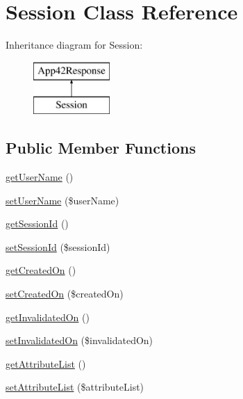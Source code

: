 \hypertarget{class_session}{\section{Session Class Reference}
\label{class_session}
}
Inheritance diagram for Session\+:\begin{figure}[H]
\begin{center}
\leavevmode
\includegraphics[height=2.000000cm]{class_session}
\end{center}
\end{figure}
\subsection*{Public Member Functions}
\begin{DoxyCompactItemize}
\item 
\hyperlink{class_session_aafd6d1ef27e6acc5833aba4012e5ee77}{get\+User\+Name} ()
\item 
\hyperlink{class_session_a20f0087f72763b84d2992ba6ffee2fb2}{set\+User\+Name} (\$user\+Name)
\item 
\hyperlink{class_session_aa9889007e27fedadb28ae8f2fd77a569}{get\+Session\+Id} ()
\item 
\hyperlink{class_session_ace8bf79f08c5588b7b15f2fc69386560}{set\+Session\+Id} (\$session\+Id)
\item 
\hyperlink{class_session_a346b90b05b25684ab3d2c62566270551}{get\+Created\+On} ()
\item 
\hyperlink{class_session_adff89ef96f7c1e0f0752caca8ccc750b}{set\+Created\+On} (\$created\+On)
\item 
\hyperlink{class_session_a2a1eeaf1dae4ab3d7dcb7551877860cd}{get\+Invalidated\+On} ()
\item 
\hyperlink{class_session_a2febff796a1f30db3685bb7acdc7abf5}{set\+Invalidated\+On} (\$invalidated\+On)
\item 
\hyperlink{class_session_a2603e40c07f9a2f8345e9af9ffffe549}{get\+Attribute\+List} ()
\item 
\hyperlink{class_session_a680d93c2dc2b83d3b80b32b3353a791f}{set\+Attribute\+List} (\$attribute\+List)
\end{DoxyCompactItemize}
